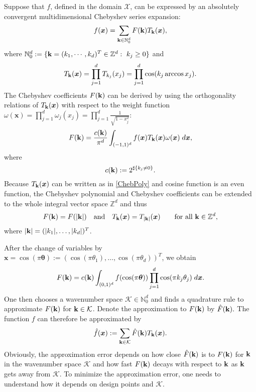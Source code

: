 \documentclass[article]{siamltex}
\def\bx{\boldsymbol x}
\def\bk{{\bf k}}
\def\bthe{{\boldsymbol \theta }}
\def\K {\mathcal {K}}
\newcommand{\Z}{{\mathbb Z}}
\newcommand{\N}{\mathbb{N}}
\newcommand{\dprod}{\displaystyle\prod}
\newcommand{\dsum}{\displaystyle\sum}
\newcommand{\dint}{\displaystyle\int}
\newcommand{\abs}[1]{\left\vert#1\right\vert}
\begin{document}
Suppose that $f$, defined in the domain $\mathcal X$, can be
expressed by an absolutely convergent multidimensional Chebyshev
series expansion:
\begin{equation}\label{cheb}
  f(\bx)=\dsum_{\bk \in {\N}^d_{0}}F(\bk)T_{\bk}(\bx),
\end{equation}
 where ${\N}^d_{0}:=\{\bk=(k_1,\cdots,k_d)^T \in {\Z}^d:\ k_j\geq {0}\}$ and
\begin{equation}\label{ChebPoly}
  T_{\bk}(\bx)=\dprod_{j=1}^{d}T_{k_j}(x_j)=\dprod_{j=1}^{d}
   \cos(k_j\arccos x_j).
\end{equation}
The Chebyshev coefficients $F(\bk)$ can be derived by using the
orthogonality relations of $T_{\bk}(\bx)$ with respect to the
weight function $\omega(\bx)=\dprod_{j=1}^{d}
\omega_j(x_j)=\dprod_{j=1}^{d}{\frac{1}{\sqrt{1-x_j^2}}}:$
$$
F(\bk)=\frac{c(\bk)}{\pi^d} \dint_{(-1,1)^d} f(\bx)T_{\bk}(\bx)
\omega(\bx)\;d\bx,
$$
where
$$
 c(\bk):=2^{\sharp \{k_j\neq 0\}}.
$$
Because $T_{\bk}(\bx)$ can be written as in \eqref{ChebPoly} and
cosine function is an even function, the Chebyshev polynomial and
Chebyshev coefficients can be extended to the whole integral
vector
space $\Z^d$ %
and thus
  \begin{equation}\label{k-k}
  F(\bk)=F(\abs{\bk})\quad \hbox{and}\quad
 T_{\bk}(\bx)=T_{\abs{\bk}}(\bx)
 \qquad \hbox{for all}\ \bk\in {\Z}^d,
  \end{equation}
  where $|\bk|=(|k_1|,\ldots,|k_d|)^T$.


After the change of variables by $\bx=\cos(\pi\bthe):=
\left(\cos(\pi\theta_1),\ldots, \cos(\pi\theta_d)\right)^T$, we
obtain
\begin{equation}F(\bk)={c(\bk)} \dint_{(0,1)^d} f(\cos(\pi\bthe))\dprod_{j=1}^d\cos(\pi k_j\theta_j)\;d\bx. \end{equation}
One then chooses a wavenumber space $\K \in {\N}^d_0$ and finds a
quadrature rule  to approximate  $F(\bk)$ for
$\bk\in\K$. %
Denote the approximation to $F(\bk)$ by $\hat F(\bk).$ The
function $f$ can therefore be approximated by
\begin{equation}\label{fhatK}
\hat{f}(\bx):=\dsum_{\bk\in {\K}}\hat{F}(\bk)T_{\bk}(\bx).
\end{equation}
Obviously, the approximation error depends on how close $\hat
F(\bk)$ is to $F(\bk)$ for $\bk$ in the wavenumber space $\K$ and
how fast $F(\bk)$ decays with respect to $\bk$ as $\bk$ gets away
from $\K$. To minimize the approximation error, one needs to
understand how it depends on design points and $\K$.
\end{document}
